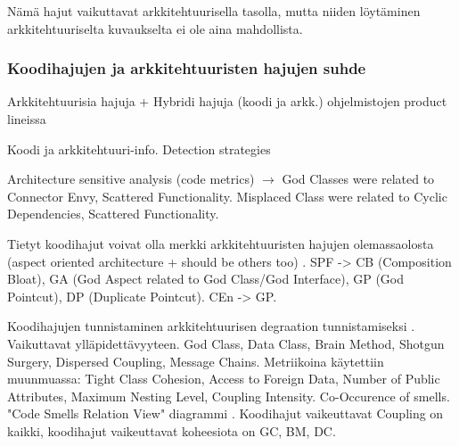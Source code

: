 \documentclass[finnish]{tktltiki2}
\theoremstyle{definition}
\theoremstyle{remark}
\begin{document}
Nämä hajut vaikuttavat arkkitehtuurisella tasolla, mutta niiden löytäminen arkkitehtuuriselta kuvaukselta ei ole aina mahdollista.


\subsubsection{Koodihajujen ja arkkitehtuuristen hajujen suhde}



Arkkitehtuurisia hajuja + Hybridi hajuja (koodi ja arkk.) ohjelmistojen product lineissa \citep{vale_bad_2014}

Koodi ja arkkitehtuuri-info. Detection strategies \citep[s. 179-182]{macia_enhancing_2013}

Architecture sensitive analysis (code metrics) \citep[s. 185]{macia_enhancing_2013} $\rightarrow$ God Classes were related to Connector Envy, Scattered Functionality. Misplaced Class were related to Cyclic Dependencies, Scattered Functionality.

Tietyt koodihajut voivat olla merkki arkkitehtuuristen hajujen olemassaolosta (aspect oriented architecture + should be others too) \citep[s. 47]{macia_impact_2011}. SPF -> CB (Composition Bloat), GA (God Aspect related to God Class/God Interface), GP (God Pointcut), DP (Duplicate Pointcut). CEn -> GP. 

Koodihajujen tunnistaminen arkkitehtuurisen degraation tunnistamiseksi \citep{fontana_towards_2015}. Vaikuttavat ylläpidettävyyteen. God Class, Data Class, Brain Method, Shotgun Surgery, Dispersed Coupling, Message Chains. Metriikoina käytettiin muunmuassa: Tight Class Cohesion, Access to Foreign Data, Number of Public Attributes, Maximum Nesting Level, Coupling Intensity. Co-Occurence of smells. "Code Smells Relation View" diagrammi \citep[s. 5]{fontana_towards_2015}. Koodihajut vaikeuttavat Coupling on kaikki, koodihajut vaikeuttavat koheesiota on GC, BM, DC. 




\end{document}
